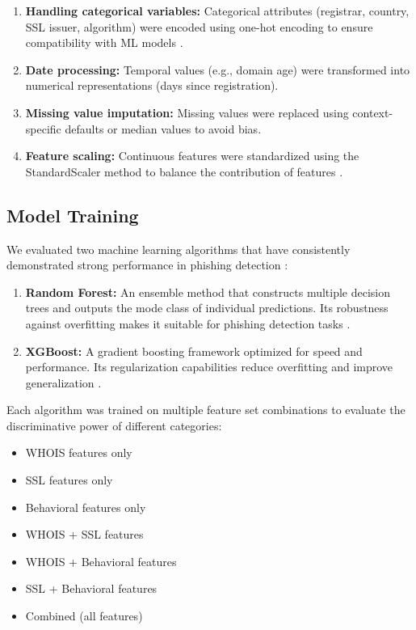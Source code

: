 \documentclass[conference]{IEEEtran}
\begin{document}
\begin{enumerate}
    \item \textbf{Handling categorical variables:} Categorical attributes (registrar, country, SSL issuer, algorithm) were encoded using one-hot encoding to ensure compatibility with ML models \cite{oni2024phishing}.
    \item \textbf{Date processing:} Temporal values (e.g., domain age) were transformed into numerical representations (days since registration).
    \item \textbf{Missing value imputation:} Missing values were replaced using context-specific defaults or median values to avoid bias.
    \item \textbf{Feature scaling:} Continuous features were standardized using the StandardScaler method to balance the contribution of features \cite{mdpi2022improved}.
\end{enumerate}

\subsection{Model Training}
We evaluated two machine learning algorithms that have consistently demonstrated strong performance in phishing detection \cite{irep2025benchmarking, academia2022mlphishing}:  

\begin{enumerate}
    \item \textbf{Random Forest:} An ensemble method that constructs multiple decision trees and outputs the mode class of individual predictions. Its robustness against overfitting makes it suitable for phishing detection tasks \cite{oni2024phishing}.
    \item \textbf{XGBoost:} A gradient boosting framework optimized for speed and performance. Its regularization capabilities reduce overfitting and improve generalization \cite{mdpi2023deeplearning}.
\end{enumerate}

Each algorithm was trained on multiple feature set combinations to evaluate the discriminative power of different categories:
\begin{itemize}
    \item WHOIS features only
    \item SSL features only
    \item Behavioral features only
    \item WHOIS + SSL features
    \item WHOIS + Behavioral features
    \item SSL + Behavioral features
    \item Combined (all features)
\end{itemize}
\end{document}
